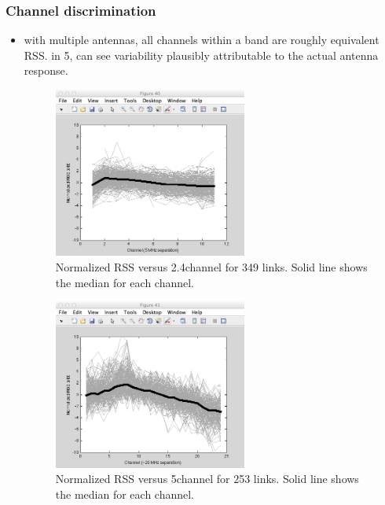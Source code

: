 \subsubsection{Channel discrimination}
\begin{itemize}
\item with multiple antennas, all channels within a band are roughly equivalent RSS\@. in 5\GHz, can see variability plausibly attributable to the actual antenna response.

\begin{figure}[htp]
	\centering
	\includegraphics[width=0.6\textwidth]{figures/esnr/rssi_vs_freq_24.png}
	\caption{\label{fig:rssi_vs_freq_24}Normalized RSS versus 2.4\GHz channel for 349 links. Solid line shows the median for each channel.}
\end{figure}
\begin{figure}[htp]
	\centering
	\includegraphics[width=0.6\textwidth]{figures/esnr/rssi_vs_freq_5.png}
	\caption{\label{fig:rssi_vs_freq_5}Normalized RSS versus 5\GHz channel for 253 links. Solid line shows the median for each channel.}
\end{figure}
\begin{figure}[htp]
	\centering

\end{figure}
\end{itemize}
